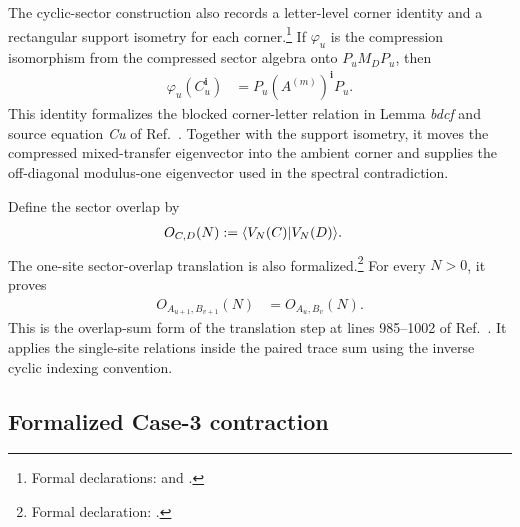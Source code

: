 \documentclass{article}
\begin{document}
The cyclic-sector construction also records a letter-level corner identity
and a rectangular support isometry for each corner.\footnote{Formal
declarations:
and
.}
If $\varphi_u$ is the compression isomorphism from the compressed sector
algebra onto $P_uM_DP_u$, then
\begin{align}
    \varphi_u(C_u^{\mathbf i})
    &=P_u(A^{(m)})^{\mathbf i}P_u.
    \label{eq:dccsp17_periodic_overlap_route_alignment_corner_letter}
\end{align}
This identity formalizes the blocked corner-letter relation in Lemma
\emph{bdcf} and source equation \emph{Cu} of
Ref.~\cite{DeLasCuevas2017Irreducible}. Together with the support isometry, it
moves the compressed mixed-transfer eigenvector into the ambient corner and
supplies the off-diagonal modulus-one eigenvector used in the spectral
contradiction.

Define the sector overlap by
\begin{align}
    O_{C,D}(N)
    &:=\langle V_N(C) | V_N(D) \rangle.
    \label{eq:dccsp17_periodic_overlap_route_alignment_sector_overlap}
\end{align}
The one-site sector-overlap translation is also formalized.\footnote{Formal
declaration:
.} For every $N>0$, it
proves
\begin{align}
    O_{A_{u+1},B_{v+1}}(N)
    &=O_{A_u,B_v}(N).
    \label{eq:dccsp17_periodic_overlap_route_alignment_overlap_translation}
\end{align}
This is the overlap-sum form of the translation step at lines 985--1002 of
Ref.~\cite{DeLasCuevas2017Irreducible}. It applies the single-site relations
inside the paired trace sum using the inverse cyclic indexing convention.

\subsection{Formalized Case-3 contraction}
\end{document}
